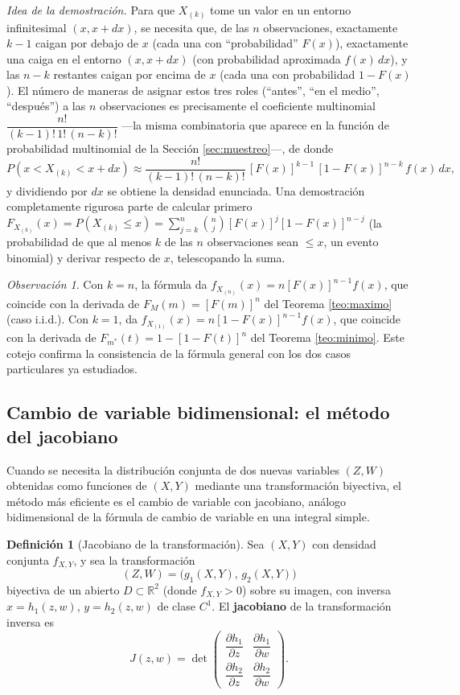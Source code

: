 \documentclass[11pt,a4paper]{article}
\theoremstyle{plain}
\theoremstyle{definition}
\newtheorem{definicion}[teorema]{Definición}
\theoremstyle{remark}
\newtheorem{observacion}[teorema]{Observación}
\begin{document}
\emph{Idea de la demostración.} Para que $X_{(k)}$ tome un valor en un entorno infinitesimal $(x,x+dx)$, se necesita que, de las $n$ observaciones, exactamente $k-1$ caigan por debajo de $x$ (cada una con ``probabilidad'' $F(x)$), exactamente una caiga en el entorno $(x,x+dx)$ (con probabilidad aproximada $f(x)\,dx$), y las $n-k$ restantes caigan por encima de $x$ (cada una con probabilidad $1-F(x)$). El número de maneras de asignar estos tres roles (``antes'', ``en el medio'', ``después'') a las $n$ observaciones es precisamente el coeficiente multinomial $\dfrac{n!}{(k-1)!\,1!\,(n-k)!}$ —la misma combinatoria que aparece en la función de probabilidad multinomial de la Sección \ref{sec:muestreo}—, de donde
\[
P(x<X_{(k)}<x+dx) \approx \frac{n!}{(k-1)!\,(n-k)!}\, [F(x)]^{k-1}\,[1-F(x)]^{n-k}\, f(x)\,dx,
\]
y dividiendo por $dx$ se obtiene la densidad enunciada. Una demostración completamente rigurosa parte de calcular primero $F_{X_{(k)}}(x) = P(X_{(k)}\le x) = \sum_{j=k}^n \binom nj [F(x)]^j[1-F(x)]^{n-j}$ (la probabilidad de que al menos $k$ de las $n$ observaciones sean $\le x$, un evento binomial) y derivar respecto de $x$, telescopando la suma.

\begin{observacion}
Con $k=n$, la fórmula da $f_{X_{(n)}}(x) = n[F(x)]^{n-1}f(x)$, que coincide con la derivada de $F_M(m)=[F(m)]^n$ del Teorema \ref{teo:maximo} (caso i.i.d.). Con $k=1$, da $f_{X_{(1)}}(x) = n[1-F(x)]^{n-1}f(x)$, que coincide con la derivada de $F_{m^*}(t) = 1-[1-F(t)]^n$ del Teorema \ref{teo:minimo}. Este cotejo confirma la consistencia de la fórmula general con los dos casos particulares ya estudiados.
\end{observacion}

\subsection{Cambio de variable bidimensional: el método del jacobiano}

Cuando se necesita la distribución conjunta de dos nuevas variables $(Z,W)$ obtenidas como funciones de $(X,Y)$ mediante una transformación biyectiva, el método más eficiente es el cambio de variable con jacobiano, análogo bidimensional de la fórmula de cambio de variable en una integral simple.

\begin{definicion}[Jacobiano de la transformación]
Sea $(X,Y)$ con densidad conjunta $f_{X,Y}$, y sea la transformación
\[
(Z,W) = \big(g_1(X,Y),\, g_2(X,Y)\big)
\]
biyectiva de un abierto $D\subset\mathbb R^2$ (donde $f_{X,Y}>0$) sobre su imagen, con inversa $x=h_1(z,w)$, $y=h_2(z,w)$ de clase $C^1$. El \textbf{jacobiano} de la transformación inversa es
\[
J(z,w) = \det\begin{pmatrix} \dfrac{\partial h_1}{\partial z} & \dfrac{\partial h_1}{\partial w} \\[2mm] \dfrac{\partial h_2}{\partial z} & \dfrac{\partial h_2}{\partial w}\end{pmatrix}.
\]
\end{definicion}
\end{document}
